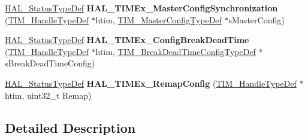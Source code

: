 \begin{DoxyCompactItemize}
\mbox{\hyperlink{stm32f4xx__hal__def_8h_a63c0679d1cb8b8c684fbb0632743478f}{H\+A\+L\+\_\+\+Status\+Type\+Def}} {\bfseries H\+A\+L\+\_\+\+T\+I\+M\+Ex\+\_\+\+Master\+Config\+Synchronization} (\mbox{\hyperlink{struct_t_i_m___handle_type_def}{T\+I\+M\+\_\+\+Handle\+Type\+Def}} $\ast$htim, \mbox{\hyperlink{struct_t_i_m___master_config_type_def}{T\+I\+M\+\_\+\+Master\+Config\+Type\+Def}} $\ast$s\+Master\+Config)
\item 
\mbox{\label{group___t_i_m_ex___exported___functions___group5_ga4414f3b3dcbed3f21ee3b06d6db9ffa4}} 
\mbox{\hyperlink{stm32f4xx__hal__def_8h_a63c0679d1cb8b8c684fbb0632743478f}{H\+A\+L\+\_\+\+Status\+Type\+Def}} {\bfseries H\+A\+L\+\_\+\+T\+I\+M\+Ex\+\_\+\+Config\+Break\+Dead\+Time} (\mbox{\hyperlink{struct_t_i_m___handle_type_def}{T\+I\+M\+\_\+\+Handle\+Type\+Def}} $\ast$htim, \mbox{\hyperlink{struct_t_i_m___break_dead_time_config_type_def}{T\+I\+M\+\_\+\+Break\+Dead\+Time\+Config\+Type\+Def}} $\ast$s\+Break\+Dead\+Time\+Config)
\item 
\mbox{\label{group___t_i_m_ex___exported___functions___group5_ga683118282daf3aa2e319eb8eea93af31}} 
\mbox{\hyperlink{stm32f4xx__hal__def_8h_a63c0679d1cb8b8c684fbb0632743478f}{H\+A\+L\+\_\+\+Status\+Type\+Def}} {\bfseries H\+A\+L\+\_\+\+T\+I\+M\+Ex\+\_\+\+Remap\+Config} (\mbox{\hyperlink{struct_t_i_m___handle_type_def}{T\+I\+M\+\_\+\+Handle\+Type\+Def}} $\ast$htim, uint32\+\_\+t Remap)
\end{DoxyCompactItemize}


\subsection{Detailed Description}
